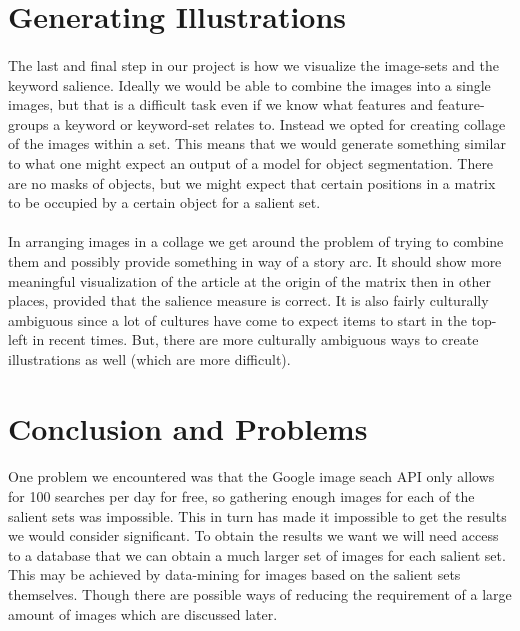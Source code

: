 \documentclass[12pt]{article}
\begin{document}
\section{Generating Illustrations}
\paragraph{}
The last and final step in our project is how we visualize the image-sets and the keyword salience. Ideally we 
would be able to combine the images into a single images, but that is a difficult task even if we know what 
features and feature-groups a keyword or keyword-set relates to. Instead we opted for creating collage of the 
images within a set. This means that we would generate something similar to what one might expect an output of 
a model for object segmentation. There are no masks of objects, but we might expect that certain positions in 
a matrix to be occupied by a certain object for a salient set.
\paragraph{}
In arranging images in a collage we get around the problem of trying to combine them and possibly provide 
something in way of a story arc. It should show more meaningful visualization of the article at the origin of 
the matrix then in other places, provided that the salience measure is correct. It is also fairly culturally 
ambiguous since a lot of cultures have come to expect items to start in the top-left in recent times. But, 
there are more culturally ambiguous ways to create illustrations as well (which are more difficult).

\section{Conclusion and Problems}
\paragraph{}
One problem we encountered was that the Google image seach API only allows for 100 searches per day for free, so 
gathering enough images for each of the salient sets was impossible. This in turn has made it impossible to 
get the results we would consider significant. To obtain the results we want we will need access to a database 
that we can obtain a much larger set of images for each salient set. This may be achieved by data-mining for
images based on the salient sets themselves. Though there are possible ways of reducing the requirement of a
large amount of images which are discussed later.
\end{document}
